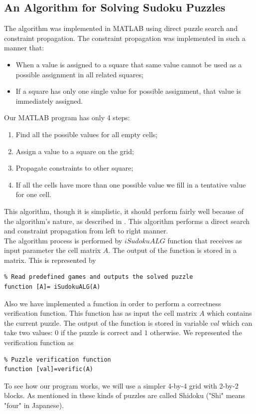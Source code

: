 \documentclass[12pt,a4paper]{article} %
\begin{document}
\subsection{An Algorithm for Solving Sudoku Puzzles}
The algorithm was implemented in MATLAB using direct puzzle search and constraint propagation. The constraint propagation was implemented in such a manner that: 
\begin{itemize}
\item When a value is assigned to a square that same value cannot be used as a possible assignment in all related squares;
\item If a square has only one single value for possible assignment, that value is immediately assigned.
\end{itemize}
Our MATLAB program has only 4 steps:
\begin{enumerate}
\item Find all the possible values for all empty cells;
\item Assign a value to a square on the grid;
\item Propagate constraints to other square;
\item If all the cells have more than one possible value we fill in a tentative value for one cell.
\end{enumerate}
This algorithm, though it is simplistic, it should perform fairly well  because of the algorithm's nature, as described in \cite{norvigsolving}. This algorithm performs a direct search and constraint propagation from left to right manner.
\newline
\\ The algorithm process is performed by $iSudokuALG$ function that receives as input parameter the cell matrix $A$. The output of the function is stored in a matrix. This is represented by
\begin{verbatim}
% Read predefined games and outputs the solved puzzle
function [A]= iSudokuALG(A)
\end{verbatim}
Also we have implemented a function in order to perform a correctness verification function. This function has as input the cell matrix $A$ which contains the current puzzle. The output of the function is stored in variable $val$ which can take two values: $0$ if the puzzle is correct and $1$ otherwise. We represented the verification function as
\begin{verbatim}
% Puzzle verification function
function [val]=verific(A)
\end{verbatim}
To see how our program works, we will use a simpler 4-by-4 grid with 2-by-2 blocks. As mentioned in \cite{crook2009pencil} these kinds of puzzles are called Shidoku ("Shi" means "four" in Japanese). 
\end{document}
